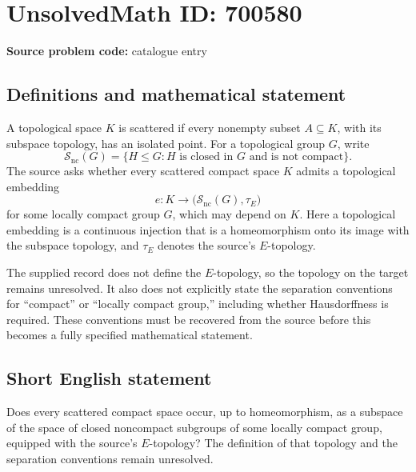 \documentclass[11pt]{article}
\begin{document}
\section*{UnsolvedMath ID: 700580}
\textbf{Source problem code:} catalogue entry
\subsection{Definitions and mathematical statement}
A topological space \(K\) is scattered if every nonempty subset \(A\subseteq K\), with its subspace topology, has an isolated point. For a topological group \(G\), write
\[
\mathcal S_{\mathrm{nc}}(G)=\{H\leq G: H\text{ is closed in }G\text{ and is not compact}\}.
\]
The source asks whether every scattered compact space \(K\) admits a topological embedding
\[
e:K\longrightarrow \bigl(\mathcal S_{\mathrm{nc}}(G),\tau_E\bigr)
\]
for some locally compact group \(G\), which may depend on \(K\). Here a topological embedding is a continuous injection that is a homeomorphism onto its image with the subspace topology, and \(\tau_E\) denotes the source's \(E\)-topology.

The supplied record does not define the \(E\)-topology, so the topology on the target remains unresolved. It also does not explicitly state the separation conventions for ``compact'' or ``locally compact group,'' including whether Hausdorffness is required. These conventions must be recovered from the source before this becomes a fully specified mathematical statement.
\subsection{Short English statement}
Does every scattered compact space occur, up to homeomorphism, as a subspace of the space of closed noncompact subgroups of some locally compact group, equipped with the source's \(E\)-topology? The definition of that topology and the separation conventions remain unresolved.
\end{document}
